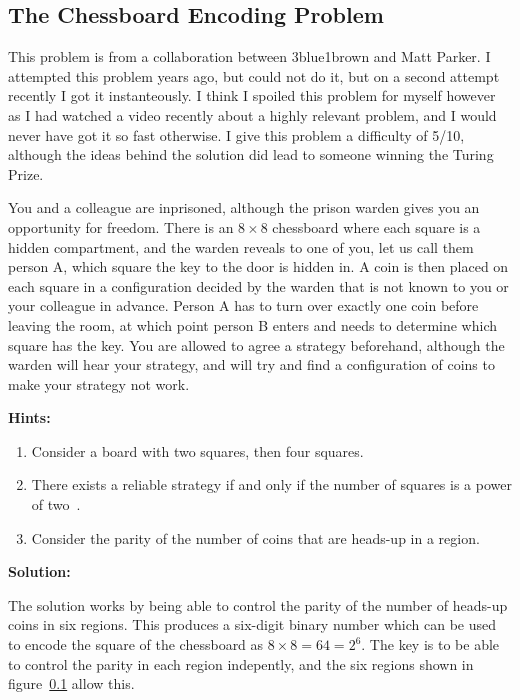 \subsection{The Chessboard Encoding Problem}

This problem is from a collaboration between 3blue1brown and Matt Parker. I attempted this problem years ago, but could not do it, but on a second attempt recently I got it instanteously. I think I spoiled this problem for myself however as I had watched a video recently about a highly relevant problem, and I would never have got it so fast otherwise. I give this problem a difficulty of 5/10, although the ideas behind the solution did lead to someone winning the Turing Prize.

You and a colleague are inprisoned, although the prison warden gives you an opportunity for freedom. There is an $8 \times 8$ chessboard where each square is a hidden compartment, and the warden reveals to one of you, let us call them person A, which square the key to the door is hidden in. A coin is then placed on each square in a configuration decided by the warden that is not known to you or your colleague in advance. Person A has to turn over exactly one coin before leaving the room, at which point person B enters and needs to determine which square has the key. You are allowed to agree a strategy beforehand, although the warden will hear your strategy, and will try and find a configuration of coins to make your strategy not work.

\textbf{Hints:}

\begin{enumerate}
	\item Consider a board with two squares, then four squares.
	\item There exists a reliable strategy if and only if the number of squares is a power of two~\cite{}.
	\item Consider the parity of the number of coins that are heads-up in a region.
\end{enumerate}

\textbf{Solution:}

The solution works by being able to control the parity of the number of heads-up coins in six regions. This produces a six-digit binary number which can be used to encode the square of the chessboard as $8 \times 8 = 64 = 2^6$. The key is to be able to control the parity in each region indepently, and the six regions shown in figure~\ref{} allow this.

